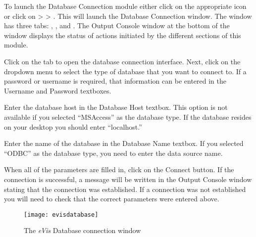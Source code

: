 \label{evis_launch_database}

To launch the Database Connection module either click on the appropriate icon
 or click on  >  >
. This will launch the Database Connection window. The window has
three tabs: , , and . The Output
Console window at the bottom of the window displays the status of actions initiated by the different
sections of this module.

\label{evis_connect_database}

Click on the  tab to open the database connection interface. Next, click on
the  dropdown menu to select the type of database that you want to
connect to. If a password or username is required, that information can be entered in the Username
and Password textboxes.

Enter the database host in the Database Host textbox. This option is not available if you selected
``MSAccess'' as the database type. If the database resides on your desktop you should enter
``localhost.''

Enter the name of the database in the Database Name textbox. If you selected ``ODBC'' as the
database type, you need to enter the data source name.

When all of the parameters are filled in, click on the Connect button. If the connection is
successful, a message will be written in the Output Console window stating that the connection was
established. If a connection was not established you will need to check that the correct parameters
were entered above.

\begin{figure}[ht]
   \begin{center}
\caption{\label{evisdatabase}The \emph{eVis} Database connection window \nixcaption}
\texttt{[image: evisdatabase]}
\end{center}
\end{figure}

